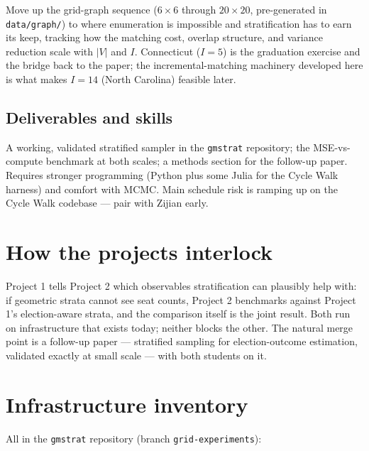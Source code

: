 \documentclass[11pt]{article}
\begin{document}
Move up the grid-graph sequence ($6\times6$ through $20\times20$,
pre-generated in \texttt{data/graph/}) to where enumeration is
impossible and stratification has to earn its keep, tracking how the
matching cost, overlap structure, and variance reduction scale with
$|V|$ and $I$. Connecticut ($I=5$) is the graduation exercise and the
bridge back to the paper; the incremental-matching machinery developed
here is what makes $I=14$ (North Carolina) feasible later.

\subsection*{Deliverables and skills}

A working, validated stratified sampler in the \texttt{gmstrat}
repository; the MSE-vs-compute benchmark at both scales; a methods
section for the follow-up paper. Requires stronger programming
(Python plus some Julia for the Cycle Walk harness) and comfort with
MCMC. Main schedule risk is ramping up on the Cycle Walk codebase ---
pair with Zijian early.

\section{How the projects interlock}

Project 1 tells Project 2 which observables stratification can
plausibly help with: if geometric strata cannot see seat counts,
Project 2 benchmarks against Project 1's election-aware strata, and
the comparison itself is the joint result. Both run on infrastructure
that exists today; neither blocks the other. The natural merge point
is a follow-up paper --- stratified sampling for election-outcome
estimation, validated exactly at small scale --- with both students on
it.

\section{Infrastructure inventory}\label{sec:infra}

All in the \texttt{gmstrat} repository (branch
\texttt{grid-experiments}):
\end{document}

